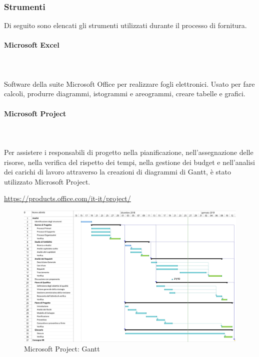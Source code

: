 		\subsubsection{Strumenti}
		Di seguito sono elencati gli strumenti utilizzati durante il processo di fornitura.
		\paragraph{Microsoft Excel} \mbox{}\\ \mbox{}\\
		Software della suite Microsoft Office per realizzare fogli elettronici. Usato per fare calcoli, produrre diagrammi, istogrammi e areogrammi, creare tabelle e grafici.
		\paragraph{Microsoft Project} \mbox{}\\ \mbox{}\\
		Per assistere i responsabili di progetto nella pianificazione, nell'assegnazione delle risorse, nella verifica del rispetto dei tempi, nella gestione dei budget e nell'analisi dei carichi di lavoro attraverso la creazioni di diagrammi di Gantt\glo, è stato utilizzato Microsoft Project. \\
		\centerline{\url{https://products.office.com/it-it/project/}}
		\begin{figure}[H]
			\includegraphics[width=0.99\linewidth]{res/images/gantt_analisi1.jpg}
			\caption{Microsoft Project: Gantt}
		\end{figure} 

     
